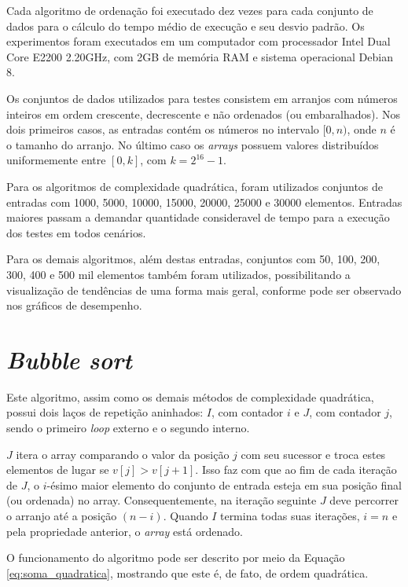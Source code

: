 \documentclass[12pt]{article}
\begin{document}
Cada algoritmo de ordenação foi executado dez vezes para cada conjunto de dados para o cálculo do tempo médio de execução e seu desvio padrão. Os experimentos foram executados em um computador com processador Intel Dual Core E2200 2.20GHz, com 2GB de memória RAM e sistema operacional Debian 8.

Os conjuntos de dados utilizados para testes consistem em arranjos com números inteiros em ordem crescente, decrescente e não ordenados (ou embaralhados). Nos dois primeiros casos, as entradas contém os números no intervalo $[0,n)$, onde $n$ é o tamanho do arranjo. No último caso os \textit{arrays} possuem valores distribuídos uniformemente entre $[0,k]$, com $k=2^{16} - 1$.

Para os algoritmos de complexidade quadrática, foram utilizados conjuntos de entradas com 1000, 5000, 10000, 15000, 20000, 25000 e 30000 elementos. Entradas maiores passam a demandar quantidade consideravel de tempo para a execução dos testes em todos cenários. 

Para os demais algoritmos, além destas entradas, conjuntos com 50, 100, 200, 300, 400 e 500 mil elementos também foram utilizados, possibilitando a visualização de tendências de uma forma mais geral, conforme pode ser observado nos gráficos de desempenho.





\section{\textit{Bubble sort}}

Este algoritmo, assim como os demais métodos de complexidade quadrática, possui dois laços de repetição aninhados: $I$, com contador $i$ e $J$, com contador $j$, sendo o primeiro \textit{loop} externo e o segundo interno.

$J$ itera o array comparando o valor da posição $j$ com seu sucessor e troca estes elementos de lugar se $v[j] > v[j+1]$. Isso faz com que ao fim de cada iteração de $J$, o $i$-ésimo maior elemento do conjunto de entrada esteja em sua posição final (ou ordenada) no array. Consequentemente, na iteração seguinte $J$ deve percorrer o arranjo até a posição $(n-i)$. Quando $I$ termina todas suas iterações, $i=n$ e pela propriedade anterior, o \textit{array} está ordenado.

O funcionamento do algoritmo pode ser descrito por meio da Equação \ref{eq:soma_quadratica}, mostrando que este é, de fato, de ordem quadrática.
\end{document}
